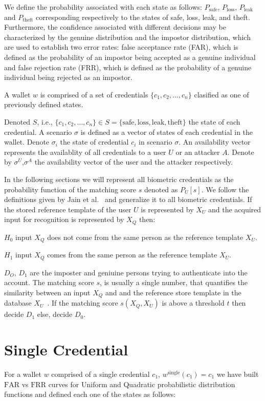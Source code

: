 \documentclass[sigconf]{acmart}
\theoremstyle{definition}
\begin{document}
We define the probability associated with each state as follows: $P_{\text{safe}}$, $P_{\text{loss}}$, $P_{\text{leak}}$ and $P_{\text{theft}}$ corresponding respectively to the states of safe, loss, leak, and theft. Furthermore, the confidence associated with different decisions may be characterized by the genuine distribution and the impostor distribution, which are used to establish two error rates: false acceptance rate (FAR), which is defined as the probability of an impostor being accepted as a genuine individual and false rejection rate (FRR), which is defined as the probability of a genuine individual being rejected as an impostor.

A wallet $w$ is comprised of a set of credentials $\{c_1, c_2, \ldots, c_n\}$ clasified as one of previously defined states.

Denoted $S$, i.e., $\{c_1, c_2, \ldots, c_n\} \in S = \{ \text{safe}, \text{loss}, \text{leak}, \text{theft} \}$ the state of each credential. A scenario $\sigma$ is defined as a vector of states of each credential in the wallet. Denote $\sigma_i$ the state of credential $c_i$ in scenario $\sigma$. An availability vector represents the availablity of all credentials to a user $U$ or an attacker $A$. Denote by $\sigma^U$,$\sigma^A$ the availability vector of the user and the attacker respectively.

In the following sections we will represent all biometric credentials as the probability function of the matching score $s$ denoted as $P_U[s]$. We follow the definitions given by Jain et al.~\cite{anil2004} and generalize it to all biometric credentials. If the stored reference template of the user $U$ is represented by $X_U$ and the acquired input for recognition is represented by $X_Q$ then:

$H_0$ input $X_Q$ does not come from the same person as the reference template $X_U$.

$H_1$ input $X_Q$ comes from the same person as the reference template $X_U$.

$D_O$, $D_1$ are the imposter and geniuine persons trying to authenticate into the account.
The matching score $s$, is usually a single number, that quantifies the similarity between an input $X_Q$ and and the reference store template in the database $X_U$~\cite{prabhakar2003}. If the matching score $s(X_Q,X_U)$ is above a threshold $t$ then decide $D_1$ else, decide $D_0$.


\section{Single Credential}\label{sec:4}
For a wallet $w$ comprised of a single credential $c_1$, $w^\text{single}(c_1)=c_1$ we have built $\mathrm{FAR}$ vs $\mathrm{FRR}$ curves for Uniform and Quadratic probabilistic distribution functions and defined each one of the states as follows:
\end{document}
